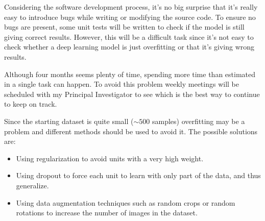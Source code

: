 
Considering the software development process, it's no big surprise that it's really easy to
introduce bugs while writing or modifying the source code. To ensure no bugs are present,
some unit tests will be written to check if the model is still giving correct results.
However, this will be a difficult task since it's not easy to check whether a deep 
learning model is just overfitting or that it's giving wrong results.


Although four months seems plenty of time, spending more time than estimated in a single task
can happen. To avoid this problem weekly meetings will be scheduled with my Principal Investigator
to see which is the best way to continue to keep on track.


Since the starting dataset is quite small (\( \sim 500 \) samples) overfitting may be a problem
and different methods should be used to avoid it. The possible solutions are:
\begin{itemize}
  \item Using regularization to avoid units with a very high weight.
  \item Using dropout to force each unit to learn with only part of the data, and thus generalize.
  \item Using data augmentation techniques such as random crops or random rotations to increase
  the number of images in the dataset.
\end{itemize}
